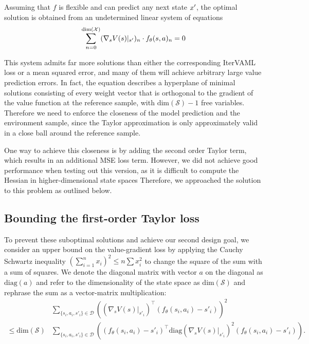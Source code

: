 Assuming that $f$ is flexible and can predict any next state $x'$, the optimal solution is obtained from an undetermined linear system of equations
\begin{align}
    \sum_{n=0}^{\text{dim}(\mathcal{X})} (\nabla_s V(s)|_{s'})_n \cdot f_\theta(s,a)_n = 0
\end{align}

This system admits far more solutions than either the corresponding IterVAML loss or a mean squared error, and many of them will achieve arbitrary large value prediction errors.
In fact, the equation describes a hyperplane of minimal solutions consisting of every weight vector that is orthogonal to the gradient of the value function at the reference sample, with $\text{dim}(\mathcal{S}) - 1$ free variables.
Therefore we need to enforce the closeness of the model prediction and the environment sample, since the Taylor approximation is only approximately valid in a close ball around the reference sample.

One way to achieve this closeness is by adding the second order Taylor term, which results in an additional MSE loss term.
However, we did not achieve good performance when testing out this version, as it is difficult to compute the Hessian in higher-dimensional state spaces 
Therefore, we approached the solution to this problem as outlined below.

\subsection{Bounding the first-order Taylor loss}

To prevent these suboptimal solutions and achieve our second design goal, we consider an upper bound on the value-gradient loss by applying the Cauchy Schwartz inequality $\left(\sum_{i=1}^n x_i \right) ^2 \leq n \sum x_i^2$ to change the square of the sum with a sum of squares.
We denote the diagonal matrix with vector $a$ on the diagonal as $\text{diag}(a)$ and refer to the dimensionality of the state space as $\text{dim}(\mathcal{S})$ and rephrase the sum as a vector-matrix multiplication:
\begin{align}
    &\sum_{\{s_i,a_i,s'_i\}\in\mathcal{D}} {\left((\nabla_s V(s)|_{s'_i})^\intercal(f_\theta(s_i,a_i) - s'_i) \right)^2}\\
    \leq {\text{dim}(\mathcal{S})} &\sum_{\{s_i,a_i,s'_i\}\in\mathcal{D}}\left((f_\theta(s_i,a_i) - s'_i)^\intercal\text{diag}(\nabla_s V(s)|_{s'_i})^2(f_\theta(s_i,a_i) - s'_i) \right) \label{eq:vagram:upper_bound}.
\end{align}


